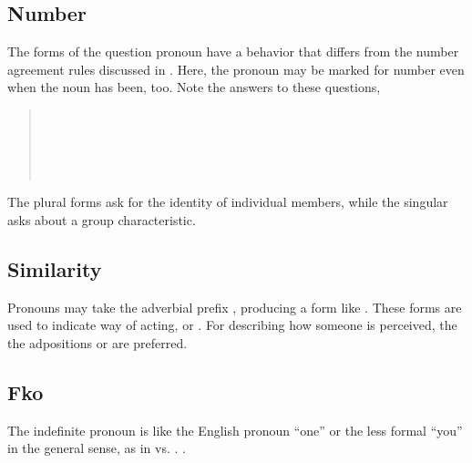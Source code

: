 \subsection{Number} The forms of the question pronoun  have
a behavior that differs from the number agreement rules discussed
in . \label{syn:pron:q-number}
Here, the pronoun may be marked for number even when the noun has
been, too.  Note the answers to these questions,

\begin{quotation}
\noindent{} \\
\noindent{} \\

\noindent{} \\
\noindent{}\\
\indent{}
\end{quotation}

\noindent The plural forms ask for the identity of individual members,
while the singular asks about a group characteristic.

\subsection{Similarity} Pronouns may take the adverbial prefix
, producing a form like  . These forms
are used to indicate way of acting,   or . For describing how someone is
perceived, the the adpositions  or  are preferred. 

\subsection{Fko} The indefinite pronoun  is like the English
pronoun ``one'' or the less formal ``you'' in the general sense, as in
 vs. .  
 .

